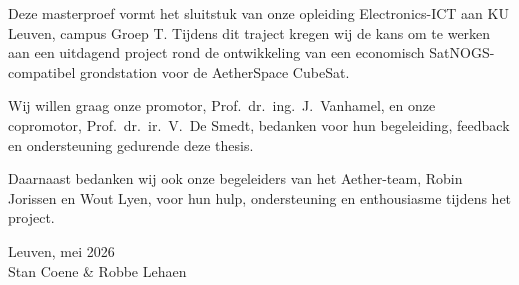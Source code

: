 Deze masterproef vormt het sluitstuk van onze opleiding Electronics-ICT aan KU Leuven, campus Groep T. Tijdens dit traject kregen wij de kans om te werken aan een uitdagend project rond de ontwikkeling van een economisch SatNOGS-compatibel grondstation voor de AetherSpace CubeSat.

Wij willen graag onze promotor, Prof.\ dr.\ ing.\ J.\ Vanhamel, en onze copromotor, Prof.\ dr.\ ir.\ V.\ De Smedt, bedanken voor hun begeleiding, feedback en ondersteuning gedurende deze thesis.

Daarnaast bedanken wij ook onze begeleiders van het Aether-team, Robin Jorissen en Wout Lyen, voor hun hulp, ondersteuning en enthousiasme tijdens het project.

\bigskip
Leuven, mei 2026\\
Stan Coene \& Robbe Lehaen
